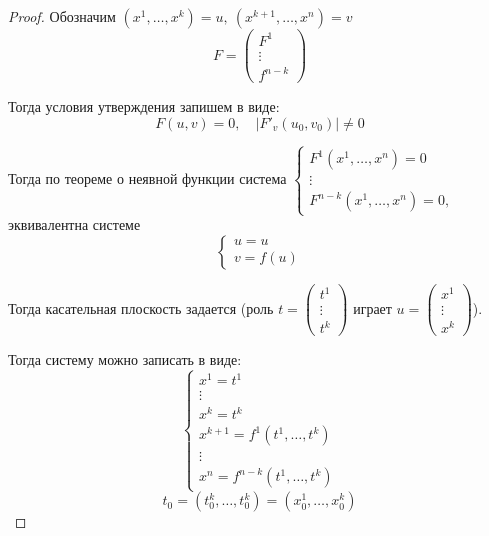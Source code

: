 \documentclass{report}
\theoremstyle{definition}
\begin{document}
\begin{proof}
  Обозначим $(x^1,\ldots,x^k) = u, \ (x^{k+1},\ldots,x^n) = v$
  \begin{equation*}
    F = \left(\begin{array}{c}
      F^1    \\
      \vdots \\
      f^{n-k}
    \end{array}\right)
  \end{equation*}

  Тогда условия утверждения запишем в виде:
  \begin{equation*}
    F(u,v) = 0, \quad |F'_v(u_0,v_0)| \ne 0
  \end{equation*}

  Тогда по теореме о неявной функции система $\left\{\begin{array}{l}
      F^1(x^1,\ldots,x^n) = 0 \\
      \vdots                  \\
      F^{n-k}(x^1,\ldots,x^n) = 0,
    \end{array}\right.$ эквивалентна системе
  \begin{equation*}
    \left\{\begin{array}{l}
      u = u \\
      v = f(u)
    \end{array}\right.
  \end{equation*}

  Тогда касательная плоскость задается (роль $t = \left(\begin{array}{c}
        t^1    \\
        \vdots \\
        t^k
      \end{array}\right)$ играет $u = \left(\begin{array}{c}
        x^1    \\
        \vdots \\
        x^k
      \end{array}\right)$).

  Тогда систему можно записать в виде:
  \begin{equation*}
    \left\{\begin{array}{l}
      x^1 = t^1                       \\
      \vdots                          \\
      x^k = t^k                       \\
      x^{k + 1} = f^1(t^1,\ldots,t^k) \\
      \vdots                          \\
      x^n = f^{n-k}(t^1,\ldots,t^k)
    \end{array}\right.
  \end{equation*}
  \begin{equation*}
    t_0 = (t_0^k,\ldots,t_0^k) = (x_0^1,\ldots,x_0^k)
  \end{equation*}


\end{proof}
\end{document}
